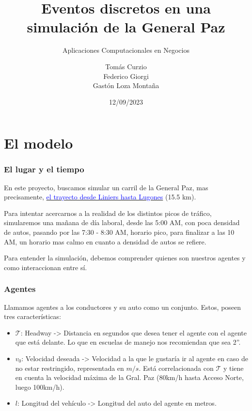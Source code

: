 \documentclass[10pt, compress]{beamer}
\title{Eventos discretos en una simulaci\'on de la General Paz }
\subtitle{Aplicaciones Computacionales en Negocios}
\date{12/09/2023}
\author{Tom\'as Curzio \\ Federico Giorgi \\ Gast\'on Loza Monta\~na  }
\institute{Universidad Torcuato Di Tella}
\begin{document}
\maketitle

\section{El modelo}

\begin{frame}[fragile]

\frametitle{El lugar y el tiempo}
En este proyecto, buscamos simular un carril de la General Paz, mas precisamente, \href{https://www.google.com.ar/maps/dir/-34.6549026,-58.5273448/RN+A001,+Buenos+Aires/@-34.5529941,-58.5215513,13z/data=!4m9!4m8!1m0!1m5!1m1!1s0x95bcb6a69ad1fc61:0x7f1d6a8008451498!2m2!1d-58.4682776!2d-34.5357282!3e0?entry=ttu}{\textcolor{blue}{el trayecto desde Liniers hasta Lugones}} (15.5 km). 

Para intentar acercarnos a la realidad de los distintos picos de tr\'afico, simularemos una ma\~nana de d\'ia laboral, desde las 5:00 AM, con poca densidad de autos, pasando por las 7:30 - 8:30 AM, horario pico, para finalizar a las 10 AM, un horario mas calmo en cuanto a densidad de autos se refiere.

Para entender la simulaci\'on, debemos comprender quienes son nuestros agentes y como interaccionan entre s\'i.

\end{frame}

\begin{frame}[fragile]

\frametitle{Agentes}

Llamamos agentes a los conductores y su auto como un conjunto. Estos, poseen tres caracter\'isticas:

\begin{itemize}
\item $\mathcal{T}$: Headway -> Distancia en segundos que desea tener el agente con el agente que est\'a delante. Lo que en escuelas de manejo nos recomiendan que sea 2''.
\item $v_0$: Velocidad deseada -> Velocidad a la que le gustar\'ia ir al agente en caso de no estar restringido, representada en $m/s$. Est\'a correlacionada con $\mathcal{T}$ y tiene en cuenta la velocidad m\'axima de la Gral. Paz (80km/h hasta Acceso Norte, luego 100km/h).
\item $l$: Longitud del veh\'iculo -> Longitud del auto del agente en metros.
\end{itemize}

\end{frame}
\end{document}
